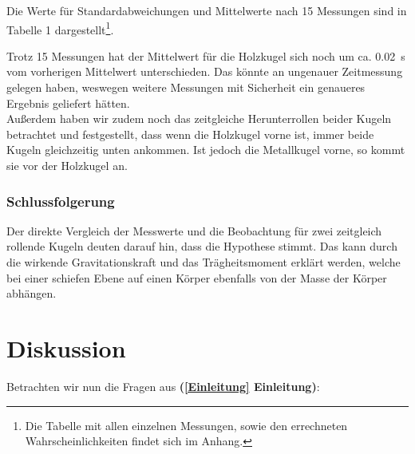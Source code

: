 \documentclass[11pt,a4paper,titlepage, ngerman]{article}
\begin{document}
				Die Werte für Standardabweichungen und Mittelwerte nach 15 Messungen sind in Tabelle 1 dargestellt\footnote{Die Tabelle mit allen einzelnen Messungen, sowie den errechneten Wahrscheinlichkeiten findet sich im Anhang.}.
								
				Trotz 15 Messungen hat der Mittelwert für die Holzkugel sich noch um ca. \SI{0.02}{s} vom vorherigen Mittelwert unterschieden. Das könnte an ungenauer Zeitmessung gelegen haben, weswegen weitere Messungen mit Sicherheit ein genaueres Ergebnis geliefert hätten. \\

				Außerdem haben wir zudem noch das zeitgleiche Herunterrollen beider Kugeln betrachtet und festgestellt, dass wenn die Holzkugel vorne ist, immer beide Kugeln gleichzeitig unten ankommen. Ist jedoch die Metallkugel vorne, so kommt sie vor der Holzkugel an.	
				
			\subsubsection{Schlussfolgerung}
				\label{2.3.3}
				
				Der direkte Vergleich der Messwerte und die Beobachtung für zwei zeitgleich rollende Kugeln deuten darauf hin, dass die Hypothese stimmt.
				Das kann durch die wirkende Gravitationskraft und das Trägheitsmoment erklärt werden, welche bei einer schiefen Ebene auf einen Körper ebenfalls von der Masse der Körper abhängen.
				
	\newpage
	\section{Diskussion}	
		\label{Diskussion}
		
		Betrachten wir nun die Fragen aus \textbf{(\ref{Einleitung} Einleitung)}: \\
		
\end{document}
